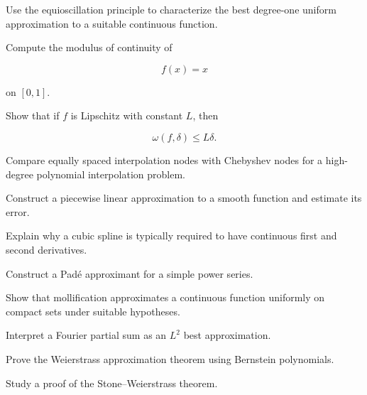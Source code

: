 \begin{exercise}[3]
Use the equioscillation principle to characterize the best degree-one
uniform approximation to a suitable continuous function.
\end{exercise}

\begin{exercise}[3]
Compute the modulus of continuity of

\[
f(x)=x
\]

on \([0,1]\).
\end{exercise}

\begin{exercise}[3]
Show that if \(f\) is Lipschitz with constant \(L\), then

\[
\omega(f,\delta)\leq L\delta.
\]
\end{exercise}

\begin{exercise}[3]
Compare equally spaced interpolation nodes with Chebyshev nodes for a
high-degree polynomial interpolation problem.
\end{exercise}

\begin{exercise}[3]
Construct a piecewise linear approximation to a smooth function and
estimate its error.
\end{exercise}

\begin{exercise}[3]
Explain why a cubic spline is typically required to have continuous
first and second derivatives.
\end{exercise}

\begin{exercise}[3]
Construct a Pad\'e approximant for a simple power series.
\end{exercise}

\begin{exercise}[3]
Show that mollification approximates a continuous function uniformly on
compact sets under suitable hypotheses.
\end{exercise}

\begin{exercise}[3]
Interpret a Fourier partial sum as an \(L^2\) best approximation.
\end{exercise}

\begin{exercise}[4]
Prove the Weierstrass approximation theorem using Bernstein polynomials.
\end{exercise}

\begin{exercise}[4]
Study a proof of the Stone--Weierstrass theorem.
\end{exercise}

